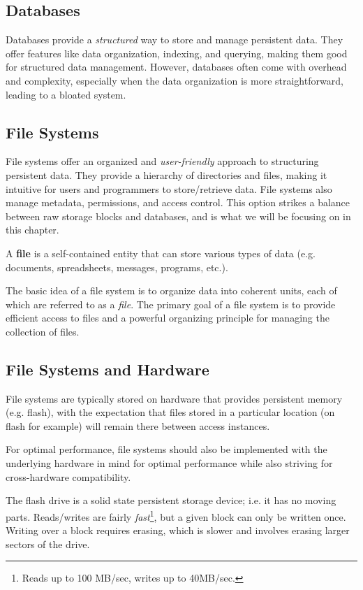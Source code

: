 \documentclass{report}
\newcommand{\definitionBegin}[1]{\begin{tcolorbox}[title={Definition: #1}]}
\newcommand{\definitionEnd}{\end{tcolorbox}}
\newcommand{\exampleBegin}[1]{\begin{tcolorbox}[colback=blue!5!white,colframe=black!75!blue,title={Example:
      #1}]}
\newcommand{\exampleEnd}{\end{tcolorbox}}
\begin{document}
\subsection*{Databases}
Databases provide a \textit{structured} way to store and manage persistent data. They offer features
like data organization, indexing, and querying, making them good for structured data
management. However, databases often come with overhead and complexity, especially when the data
organization is more straightforward, leading to a bloated system.


\subsection*{File Systems}
File systems offer an organized and \textit{user-friendly} approach to structuring
persistent data. They provide a hierarchy of directories and files, making it intuitive for users
and programmers to store/retrieve data. File systems also manage metadata, permissions, and access
control. This option strikes a balance between raw storage blocks and databases, and is what we will
be focusing on in this chapter.

\definitionBegin{File}
A \textbf{file} is a self-contained entity that can store various types of data (e.g. documents,
spreadsheets, messages, programs, etc.).
\definitionEnd

The basic idea of a file system is to organize data into coherent units, each of which are referred
to as a \textit{file}. The primary goal of a file system is to provide efficient access to files and
a powerful organizing principle for managing the collection of files.


\subsection{File Systems and Hardware}
File systems are typically stored on hardware that provides persistent memory (e.g. flash), with the
expectation that files stored in a particular location (on flash for example) will remain there
between access instances.

For optimal performance, file systems should also be implemented with the underlying hardware in
mind for optimal performance while also striving for cross-hardware compatibility.

\exampleBegin{Flash Drives}
The flash drive is a solid state persistent storage device; i.e. it has no moving
parts. Reads/writes are fairly \textit{fast}\footnote{Reads up to 100 MB/sec, writes up to
  40MB/sec.}, but a given block can only be written once. Writing over a block requires erasing,
which is slower and involves erasing larger sectors of the drive.
\exampleEnd
\end{document}
